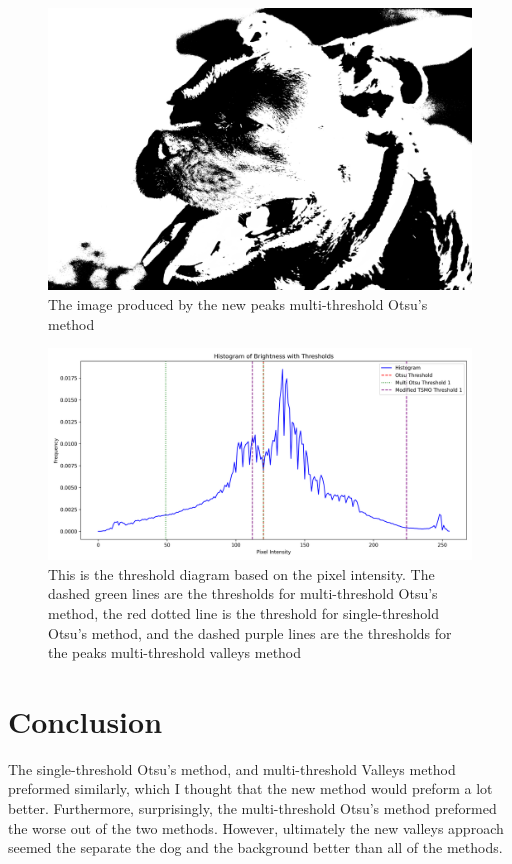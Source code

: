 \documentclass[10pt,twocolumn,letterpaper]{article}
\begin{document}
\begin{figure}[h!]
    \centering
    \includegraphics[width=0.8\linewidth]{modified_tsmo_image.png}
    \caption{The image produced by the new peaks multi-threshold Otsu's method  }
    \label{fig:new}
\end{figure}



\begin{figure}[h!]
    \centering
    \includegraphics[width=.8\linewidth]{thresholding_result.png}
    \caption{This is the threshold diagram based on the pixel intensity. The dashed green lines are the thresholds for multi-threshold Otsu's method, the red dotted line is the threshold for single-threshold Otsu's method, and the dashed purple lines are the thresholds for the peaks multi-threshold valleys method }
    \label{fig:new}
\end{figure}
\section{Conclusion}
The single-threshold Otsu's method, and multi-threshold Valleys method preformed similarly, which I thought that the new method would preform a lot better. Furthermore, surprisingly, the multi-threshold Otsu's method preformed the worse out of the two methods. However, ultimately the new valleys approach seemed the separate the dog and the background better than all of the methods.

{\small



}
\end{document}
